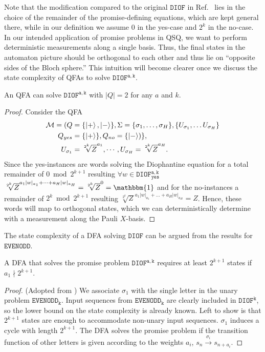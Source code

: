 \documentclass[../main.tex]{subfiles}
\begin{document}
Note that the modification compared to the original $\mathtt{DIOF}$ in Ref.~\cite{bianchi2014complexity} lies in the choice of the remainder of the promise-defining equations, which are kept general there, while in our definition we assume $0$ in the yes-case and $2^k$ in the no-case. In our intended application of promise problems in QSQ, we want to perform deterministic measurements along a single basis. Thus, the final states in the automaton picture should be orthogonal to each other and thus lie on ``opposite sides of the Bloch sphere.'' This intuition will become clearer once we discuss the state complexity of QFAs to solve $\mathtt{DIOF^{a,k}}$.

\begin{theorem}
    An QFA can solve $\mathtt{DIOF^{a,k}}$ with $|Q|=2$ for any $a$ and $k$.
\end{theorem}

\begin{proof}
    Consider the QFA 
    \begin{align*}
        \mathcal{M} = ( Q &= \{ \ket{+},\ket{-} \}, \Sigma = \{\sigma_1, \dots, \sigma_H \}, \{U_{\sigma_1},\dots U_{\sigma_H}\}  \\
        Q_{yes} &= \{ \ket{+} \}, Q_{no} = \{ \ket{-}) \}, \\
        U_{\sigma_1} &= \sqrt[2^k]{Z}^{a_1}, \cdots, U_{\sigma_H} = \sqrt[2^k]{Z}^{a_H} . 
    \end{align*}
    Since the yes-instances are words solving the Diophantine equation for a total remainder of $0 \bmod{2^{k+1}}$ resulting $\forall w \in \mathtt{DIOF^{a,k}_{yes}}$ $\sqrt[2^k]{Z}^{a_1|w|_{a_1}+ \dots + a_H|w|_{a_H}} = \sqrt[2^k]{Z}^{0} = \mathbbm{1}$ and for the no-instances a remainder of $2^k \bmod{2^{k+1}}$ resulting $\sqrt[2^k]{Z}^{a_1|w|_{a_1}+ \dots + a_H|w|_{a_H}} = Z$. Hence, these words will map to orthogonal states, which we can deterministically determine with a measurement along the Pauli $X$-basis.
\end{proof}


The state complexity of a DFA solving $\mathtt{DIOF}$ can be argued from the results for $\mathtt{EVENODD}$.

\begin{theorem}
    A DFA that solves the promise problem $\mathtt{DIOF^{a,k}}$ requires at least $2^{k+1}$ states if $a_1 \nmid 2^{k+1}$.
\end{theorem}

\begin{proof} (Adopted from \cite{bianchi2014complexity})
    We associate $\sigma_1$ with the single letter in the unary problem $\mathtt{EVENODD_k}$. Input sequences from $\mathtt{EVENODD_k}$ are clearly included in $\mathtt{DIOF^{k}}$, so the lower bound on the state complexity is already known. Left to show is that $2^{k+1}$ states are enough to accommodate non-unary input sequences. $\sigma_1$ induces a cycle with length $2^{k+1}$. The DFA solves the promise problem if the transition function of other letters is given according to the weights $a_i$, $s_n \xrightarrow{\sigma_i} s_{n+a_i}$.
\end{proof}
\end{document}
